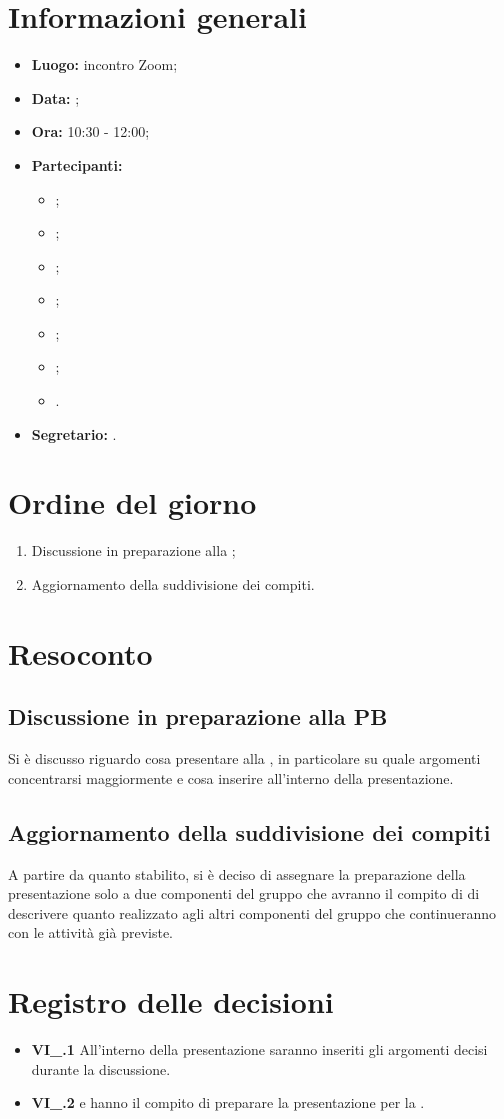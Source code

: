 \section{Informazioni generali}
\begin{itemize}
	\item \textbf{Luogo:} incontro Zoom;
	\item \textbf{Data:} \Data;
	\item \textbf{Ora:} 10:30 - 12:00;
	\item \textbf{Partecipanti:}
	\begin{itemize}
		\item \BL{}; 
		\item \FF{};
		\item \MM{}; 
		\item \PC{};
		\item \TG{};
		\item \TL{};
		\item \VD{}.
	\end{itemize} 
	\item \textbf{Segretario:} \FF{}.
\end{itemize}

\section{Ordine del giorno}
\begin{enumerate}
	\item Discussione in preparazione alla ;
	\item Aggiornamento della suddivisione dei compiti.
\end{enumerate}

\section{Resoconto}
\subsection{Discussione in preparazione alla PB}
Si è discusso riguardo cosa presentare alla , in particolare su quale argomenti concentrarsi maggiormente e cosa inserire all'interno della presentazione. 
\subsection{Aggiornamento della suddivisione dei compiti}
A partire da quanto stabilito, si è deciso di assegnare la preparazione della presentazione solo a due componenti del gruppo che avranno il compito di di descrivere quanto realizzato agli altri componenti del gruppo che continueranno con le attività già previste. 

\section{Registro delle decisioni}
\begin{itemize}
	\item \textbf{VI\_\Data.1} 
	All'interno della presentazione saranno inseriti gli argomenti decisi durante la discussione.
	\item \textbf{VI\_\Data.2} 
	\FF e \TL hanno il compito di preparare la presentazione per la .
\end{itemize}